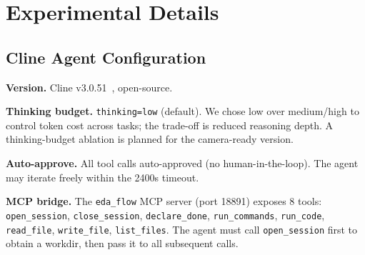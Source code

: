 ﻿\section{Experimental Details}
\label{sec:experimental-details}


\subsection{Cline Agent Configuration}
\label{sec:cline-config}

\textbf{Version.} Cline v3.0.51~\cite{cline2026}, open-source.

\textbf{Thinking budget.} \texttt{thinking=low} (default). We chose low over medium/high to control token cost across \Ntasks{} tasks; the trade-off is reduced reasoning depth. A thinking-budget ablation is planned for the camera-ready version.

\textbf{Auto-approve.} All tool calls auto-approved (no human-in-the-loop). The agent may iterate freely within the 2400s timeout.

\textbf{MCP bridge.} The \texttt{eda\_flow} MCP server (port 18891) exposes 8 tools: \texttt{open\_session}, \texttt{close\_session}, \texttt{declare\_done}, \texttt{run\_commands}, \texttt{run\_code}, \texttt{read\_file}, \texttt{write\_file}, \texttt{list\_files}. The agent must call \texttt{open\_session} first to obtain a workdir, then pass it to all subsequent calls.

